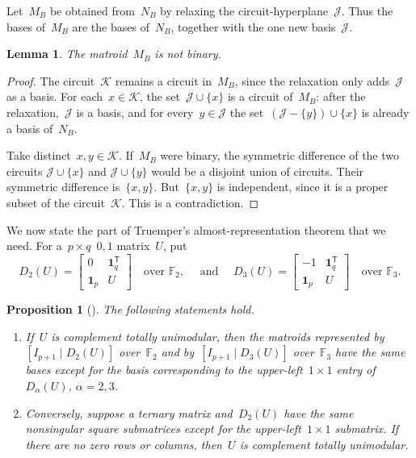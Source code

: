 \documentclass{amsart}
\newtheorem{lemma}[theorem]{Lemma}
\newtheorem{proposition}[theorem]{Proposition}
\numberwithin{equation}{section}
\newcommand{\F}{\mathbb F}
\newcommand{\one}{\mathbf 1}
\newcommand{\cJ}{\mathcal J}
\newcommand{\cK}{\mathcal K}
\newcommand{\sfT}{\mathsf T}
\newcommand{\wideand}{ \quad \text{ and } \quad }
\begin{document}
Let~$M_B$ be obtained from~$N_B$ by relaxing the circuit-hyperplane~$\cJ$.
Thus the bases of~$M_B$ are the bases of~$N_B$, together with the one new basis~$\cJ$.

\begin{lemma}\label{lem:not-binary}
    The matroid~$M_B$ is not binary.
\end{lemma}
\begin{proof}
    The circuit~$\cK$ remains a circuit in~$M_B$, since the relaxation only adds~$\cJ$ as a basis.
    For each~$x\in\cK$, the set~$\cJ\cup\{x\}$ is a circuit of~$M_B$: after the relaxation,~$\cJ$ is a basis, and for every~$y\in\cJ$ the set~$(\cJ-\{y\})\cup\{x\}$ is already a basis of~$N_B$.
    
    Take distinct~$x,y\in\cK$.
    If~$M_B$ were binary, the symmetric difference of the two circuits $\cJ\cup\{x\}$ and $\cJ\cup\{y\}$ would be a disjoint union of circuits.
    Their symmetric difference is~$\{x,y\}$.
    But~$\{x,y\}$ is independent, since it is a proper subset of the circuit~$\cK$.
    This is a contradiction.
\end{proof}

We now state the part of Truemper's almost-representation theorem that we need.
For a~$p\times q$~$0,1$ matrix~$U$, put
\begin{equation}\label{eq:D2D3}
    D_2(U)=
        \begin{bmatrix}
            0&\one_q^{\sfT}\\
            \one_p&U
        \end{bmatrix} \quad\text{over }\F_2, \wideand 
    D_3(U)=
        \begin{bmatrix}
            -1&\one_q^{\sfT}\\
            \one_p&U
        \end{bmatrix} \quad\text{over }\F_3.
\end{equation}

\begin{proposition}[{\cite[Theorem~12.3.8]{Truemper1992book}}]\label{prop:truemper}
    The following statements hold.
    \begin{enumerate}
    \item If~$U$ is complement totally unimodular, then the matroids represented by~$[I_{p+1}\mid D_2(U)]$ over~$\F_2$ and by~$[I_{p+1}\mid D_3(U)]$ over~$\F_3$ have the same bases except for the basis corresponding to the upper-left~$1\times1$ entry of $D_\alpha(U)$, $\alpha=2,3$.
    \item Conversely, suppose a ternary matrix and~$D_2(U)$ have the same nonsingular square submatrices except for the upper-left~$1\times1$ submatrix.
    If there are no zero rows or columns, then~$U$ is complement totally unimodular.
    \end{enumerate}
\end{proposition}
\end{document}

